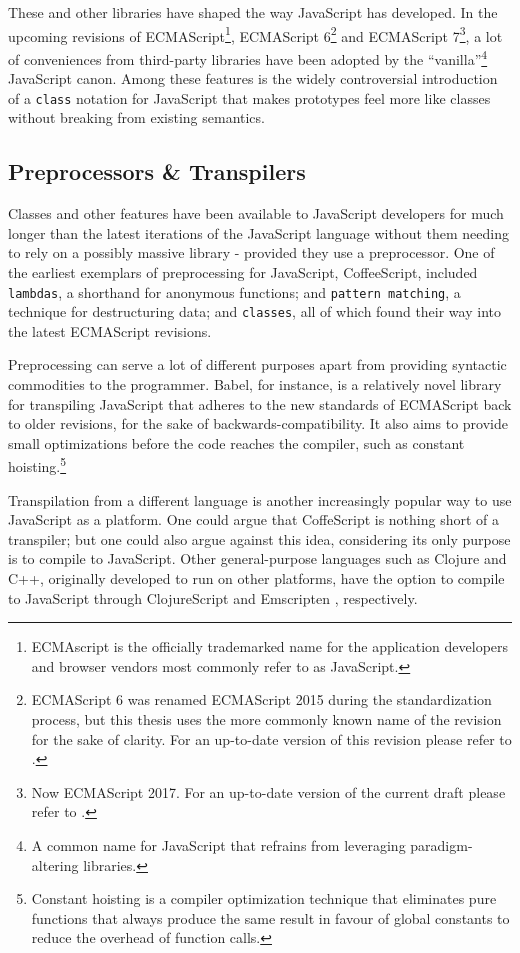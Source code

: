 \documentclass[oneside,11pt,xetex]{scrbook}
\begin{document}
These and other libraries have shaped the way JavaScript has developed. In the
upcoming revisions of ECMAScript\footnote{ECMAscript is the officially trademarked
name for the application developers and browser vendors most commonly refer to as
JavaScript.}, ECMAScript 6\footnote{ECMAScript 6 was renamed ECMAScript 2015
during the standardization process, but this thesis uses the more commonly known name
of the revision for the sake of clarity. For an up-to-date version of this revision
please refer to \parencite{ECMA6}.} and ECMAScript 7\footnote{Now ECMAScript 2017. For
an up-to-date version of the current draft please refer to \parencite{ECMA7}.}, a
lot of conveniences from third-party libraries have been adopted by the
``vanilla''\footnote{A common name for JavaScript that refrains from leveraging
paradigm-altering libraries.} JavaScript canon.
Among these features is the widely controversial introduction of a \texttt{class}
notation for JavaScript that makes prototypes feel more like classes without
breaking from existing semantics.

\subsection{Preprocessors \& Transpilers}
\label{pretrans}

Classes and other features have been available to JavaScript developers for much
longer than the latest iterations of the JavaScript language without them needing
to rely on a possibly massive library - provided they use a preprocessor.
One of the earliest exemplars of preprocessing for JavaScript, CoffeeScript, included
\texttt{lambdas}, a shorthand for anonymous functions; and \texttt{pattern matching},
a technique for destructuring data; and \texttt{classes}, all of which found
their way into the latest ECMAScript revisions.

Preprocessing can serve a lot of different purposes apart from providing
syntactic commodities to the programmer. Babel, for instance, is a relatively
novel library for transpiling JavaScript that adheres to the new standards
of ECMAScript back to older revisions, for the sake of backwards-compatibility.
It also aims to provide small optimizations before the code reaches the compiler,
such as constant hoisting.\footnote{Constant hoisting is a compiler optimization
technique that eliminates pure functions that always produce the same result in favour
of global constants to reduce the overhead of function calls.}

Transpilation from a different language is another increasingly popular
way to use JavaScript as a platform. One could argue that CoffeScript
is nothing short of a transpiler; but one could also argue against this idea,
considering its only purpose is to compile to JavaScript. Other general-purpose
languages such as Clojure and C++, originally developed to run on other platforms,
have the option to compile to JavaScript through ClojureScript \parencite{CLJS} and
Emscripten \parencite{ZAKA}, respectively.
\end{document}

